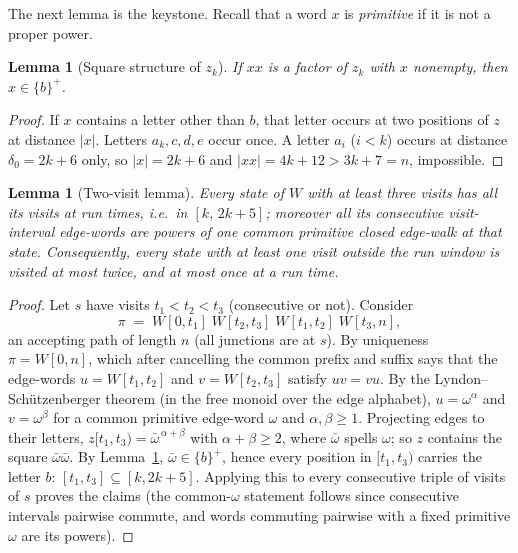 \documentclass[11pt]{article}
\newtheorem{lemma}[theorem]{Lemma}
\theoremstyle{definition}
\begin{document}
The next lemma is the keystone. Recall that a word $x$ is \emph{primitive} if
it is not a proper power.

\begin{lemma}[Square structure of $z_k$]\label{lem:squarefree}
If $xx$ is a factor of $z_k$ with $x$ nonempty, then $x\in\{b\}^+$.
\end{lemma}

\begin{proof}
If $x$ contains a letter other than $b$, that letter occurs at two positions
of $z$ at distance $|x|$. Letters $a_k,c,d,e$ occur once. A letter $a_i$
($i<k$) occurs at distance $\delta_0=2k+6$ only, so $|x|=2k+6$ and
$|xx|=4k+12>3k+7=n$, impossible.
\end{proof}

\begin{lemma}[Two-visit lemma]\label{lem:twovisit}
Every state of $W$ with at least three visits has all its visits at run
times, i.e.\ in $[k,\,2k+5]$; moreover all its consecutive visit-interval
edge-words are powers of one common primitive closed edge-walk at that state.
Consequently, every state with at least one visit outside the run window is
visited at most twice, and at most once at a run time.
\end{lemma}

\begin{proof}
Let $s$ have visits $t_1<t_2<t_3$ (consecutive or not). Consider
\[
\pi \;=\; W[0,t_1]\; W[t_2,t_3]\; W[t_1,t_2]\; W[t_3,n],
\]
an accepting path of length $n$ (all junctions are at $s$). By uniqueness
$\pi=W[0,n]$, which after cancelling the common prefix and suffix says that
the edge-words $u=W[t_1,t_2]$ and $v=W[t_2,t_3]$ satisfy $uv=vu$. By the
Lyndon--Sch\"utzenberger theorem (in the free monoid over the edge alphabet),
$u=\omega^{\alpha}$ and $v=\omega^{\beta}$ for a common primitive edge-word
$\omega$ and $\alpha,\beta\ge1$. Projecting edges to their letters,
$z[t_1,t_3)=\bar\omega^{\,\alpha+\beta}$ with $\alpha+\beta\ge2$, where
$\bar\omega$ spells $\omega$; so $z$ contains the square $\bar\omega\bar\omega$.
By Lemma~\ref{lem:squarefree}, $\bar\omega\in\{b\}^+$, hence every position in
$[t_1,t_3)$ carries the letter $b$: $[t_1,t_3]\subseteq[k,2k+5]$. Applying
this to every consecutive triple of visits of $s$ proves the claims (the
common-$\omega$ statement follows since consecutive intervals pairwise
commute, and words commuting pairwise with a fixed primitive $\omega$ are its
powers).
\end{proof}
\end{document}
